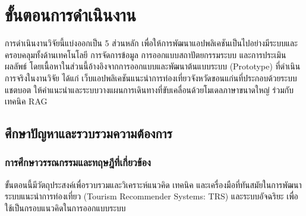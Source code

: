 
\section{ขั้นตอนการดำเนินงาน}

การดำเนินงานวิจัยนี้แบ่งออกเป็น 5 ส่วนหลัก เพื่อให้การพัฒนาแอปพลิเคชันเป็นไปอย่างมีระบบและครอบคลุมทั้งด้านเทคโนโลยี การจัดการข้อมูล การออกแบบสถาปัตยกรรมระบบ และการประเมินผลลัพธ์ โดยเนื้อหาในส่วนนี้อ้างอิงจากการออกแบบและพัฒนาต้นแบบระบบ (Prototype) ที่ดำเนินการจริงในงานวิจัย ได้แก่ เว็บแอปพลิเคชันแนะนำการท่องเที่ยวจังหวัดขอนแก่นที่ประกอบด้วยระบบ แชตบอต ให้คำแนะนำและระบบวางแผนการเดินทางที่ขับเคลื่อนด้วยโมเดลภาษาขนาดใหญ่ ร่วมกับเทคนิค RAG

\subsection{ศึกษาปัญหาและรวบรวมความต้องการ}

\subsubsection{การศึกษาวรรณกรรมและทฤษฎีที่เกี่ยวข้อง}

ขั้นตอนนี้มีวัตถุประสงค์เพื่อรวบรวมและวิเคราะห์แนวคิด เทคนิค และเครื่องมือที่ทันสมัยในการพัฒนาระบบแนะนำการท่องเที่ยว (Tourism Recommender Systems: TRS) และระบบอัจฉริยะ เพื่อใช้เป็นกรอบแนวคิดในการออกแบบระบบ

